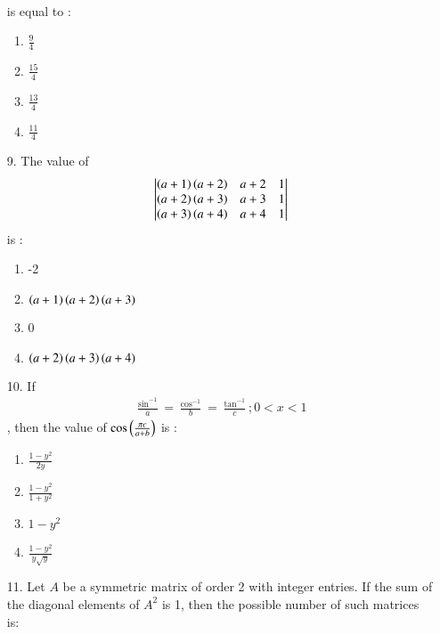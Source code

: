 \documentclass[journal,12pt,onecolumn]{IEEEtran}
\theoremstyle{remark}
\begin{document}
\begin{enumerate}
\begin{align}
	\end{align} is equal to :
	\begin{multicols}{4}
		\begin{enumerate}
			\item $\frac{9}{4}$ \columnbreak
			\item $\frac{15}{4}$ \columnbreak
			\item $\frac{13}{4}$ \columnbreak
			\item $\frac{11}{4}$
		\end{enumerate}
	\end{multicols}
\item[9.] The value of
		\begin{align}
			\begin{vmatrix}
			\left(a+1\right)\left(a+2\right) & a+2 & 1 \\
			\left(a+2\right)\left(a+3\right) & a+3 & 1 \\
			\left(a+3\right)\left(a+4\right) & a+4 & 1
			\end{vmatrix}
		\end{align} is :
	
		\begin{enumerate}
			\item -2 
			\item $\left(a+1\right)\left(a+2\right)\left(a+3\right)$ 
			\item 0 
			\item $\left(a+2\right)\left(a+3\right)\left(a+4\right)$
		\end{enumerate}
\item[10.] If
		\begin{align}
			\frac{\sin ^{-1}}{a} = \frac{\cos ^{-1}}{b} = \frac{\tan ^{-1}}{c};
			0 < x < 1
		\end{align}, then the value of $\cos \left(\frac{\pi c}{a+b}\right)$ is :
		
		\begin{enumerate}
			\item $\frac{1 - y^2}{2y}$ \\
			\item $\frac{1 - y^2}{1 + y^2}$\\
			\item $1 - y^2$ \\
			\item $\frac{1 - y^2}{y\sqrt{y}}$
		\end{enumerate}
\item[11.] Let $A$ be a symmetric matrix of order 2 with integer entries. If the sum of the diagonal
	elements of $A^2$ is 1, then the possible number of such matrices is:
		

\end{enumerate}
\end{document}
